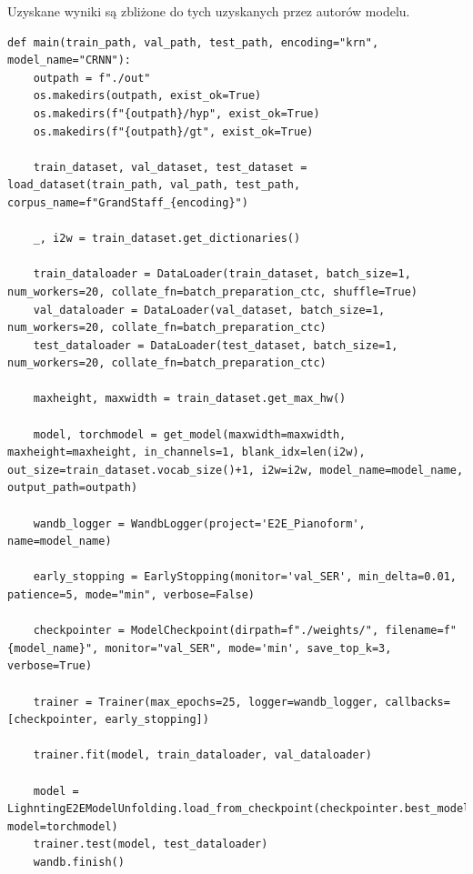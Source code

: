 Uzyskane wyniki są zbliżone do tych uzyskanych przez autorów modelu\cite{Rios-Vila2023}.

\begin{lstlisting}[caption={Główna funkcja procesu uczenia modelu.}, label={model-training-main}]
def main(train_path, val_path, test_path, encoding="krn", model_name="CRNN"):
	outpath = f"./out"
	os.makedirs(outpath, exist_ok=True)
	os.makedirs(f"{outpath}/hyp", exist_ok=True)
	os.makedirs(f"{outpath}/gt", exist_ok=True)
	
	train_dataset, val_dataset, test_dataset = load_dataset(train_path, val_path, test_path, corpus_name=f"GrandStaff_{encoding}")
	
	_, i2w = train_dataset.get_dictionaries()
	
	train_dataloader = DataLoader(train_dataset, batch_size=1, num_workers=20, collate_fn=batch_preparation_ctc, shuffle=True)
	val_dataloader = DataLoader(val_dataset, batch_size=1, num_workers=20, collate_fn=batch_preparation_ctc)
	test_dataloader = DataLoader(test_dataset, batch_size=1, num_workers=20, collate_fn=batch_preparation_ctc)
	
	maxheight, maxwidth = train_dataset.get_max_hw()
	
	model, torchmodel = get_model(maxwidth=maxwidth, maxheight=maxheight, in_channels=1, blank_idx=len(i2w), out_size=train_dataset.vocab_size()+1, i2w=i2w, model_name=model_name, output_path=outpath)
	
	wandb_logger = WandbLogger(project='E2E_Pianoform', name=model_name)
	
	early_stopping = EarlyStopping(monitor='val_SER', min_delta=0.01, patience=5, mode="min", verbose=False)
	
	checkpointer = ModelCheckpoint(dirpath=f"./weights/", filename=f"{model_name}", monitor="val_SER", mode='min', save_top_k=3, verbose=True)
	
	trainer = Trainer(max_epochs=25, logger=wandb_logger, callbacks=[checkpointer, early_stopping])
	
	trainer.fit(model, train_dataloader, val_dataloader)
	
	model = LighntingE2EModelUnfolding.load_from_checkpoint(checkpointer.best_model_path, model=torchmodel)
	trainer.test(model, test_dataloader)
	wandb.finish()
\end{lstlisting}













